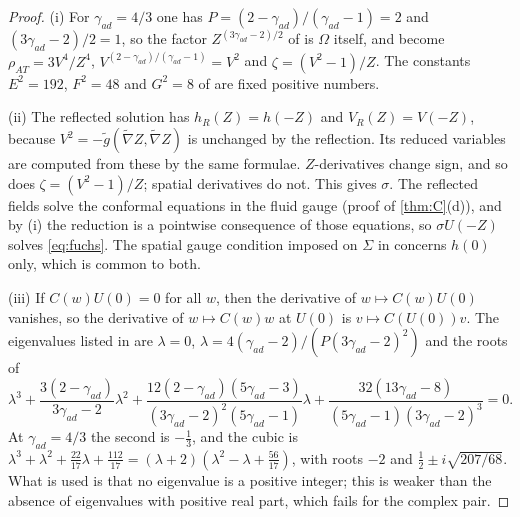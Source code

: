 \documentclass[11pt]{article}
\theoremstyle{canonmath}
\theoremstyle{canonpostulate}
\theoremstyle{canonproposition}
\theoremstyle{canonmath}
\theoremstyle{canonproposition}
\def\mathrm#1{#1}%
\def\mathbf#1{#1}%
\begin{document}
\begin{proof}
(i) For $\gamma_{\mathrm{ad}} = 4/3$ one has $P = (2-\gamma_{\mathrm{ad}})/(\gamma_{\mathrm{ad}}-1) = 2$ and $(3\gamma_{\mathrm{ad}}-2)/2 = 1$, so the factor $Z^{(3\gamma_{\mathrm{ad}}-2)/2}$ of \cite[(20)]{AnguigeTod1999a} is $\Omega$ itself, and \cite[(23), (31), (42)]{AnguigeTod1999a} become $\rho_{\mathrm{AT}} = 3V^4/Z^4$, $V^{(2-\gamma_{\mathrm{ad}})/(\gamma_{\mathrm{ad}}-1)} = V^2$ and $\zeta = (V^2-1)/Z$. The constants $E^2 = 192$, $F^2 = 48$ and $G^2 = 8$ of \cite[(54)]{AnguigeTod1999a} are fixed positive numbers.

(ii) The reflected solution has $h_R(Z) = h(-Z)$ and $V_R(Z) = V(-Z)$, because $V^2 = -\tilde g(\tilde\nabla Z,\tilde\nabla Z)$ is unchanged by the reflection. Its reduced variables are computed from these by the same formulae. $Z$-derivatives change sign, and so does $\zeta = (V^2-1)/Z$; spatial derivatives do not. This gives $\sigma$. The reflected fields solve the conformal equations in the fluid gauge (proof of \cref{thm:C}(d)), and by (i) the reduction is a pointwise consequence of those equations, so $\sigma \mathbf{U}(-Z)$ solves \eqref{eq:fuchs}. The spatial gauge condition imposed on $\Sigma$ in \cite[(69)]{AnguigeTod1999a} concerns $h(0)$ only, which is common to both.

(iii) If $C(w)\mathbf{U}(0) = 0$ for all $w$, then the derivative of $w\mapsto C(w)\mathbf{U}(0)$ vanishes, so the derivative of $w\mapsto C(w)w$ at $\mathbf{U}(0)$ is $v\mapsto C(\mathbf{U}(0))v$. The eigenvalues listed in \cite[§4.3]{AnguigeTod1999a} are $\lambda = 0$, $\lambda = 4(\gamma_{\mathrm{ad}}-2)/(P(3\gamma_{\mathrm{ad}}-2)^2)$ and the roots of
\[
\lambda^3 + \frac{3(2-\gamma_{\mathrm{ad}})}{3\gamma_{\mathrm{ad}}-2}\lambda^2 + \frac{12(2-\gamma_{\mathrm{ad}})(5\gamma_{\mathrm{ad}}-3)}{(3\gamma_{\mathrm{ad}}-2)^2(5\gamma_{\mathrm{ad}}-1)}\lambda + \frac{32(13\gamma_{\mathrm{ad}}-8)}{(5\gamma_{\mathrm{ad}}-1)(3\gamma_{\mathrm{ad}}-2)^3} = 0.
\]
At $\gamma_{\mathrm{ad}} = 4/3$ the second is $-\tfrac13$, and the cubic is $\lambda^3+\lambda^2+\tfrac{22}{17}\lambda+\tfrac{112}{17} = (\lambda+2)(\lambda^2-\lambda+\tfrac{56}{17})$, with roots $-2$ and $\tfrac12\pm i\sqrt{207/68}$. What is used is that no eigenvalue is a positive integer; this is weaker than the absence of eigenvalues with positive real part, which fails for the complex pair.
\end{proof}
\end{document}

